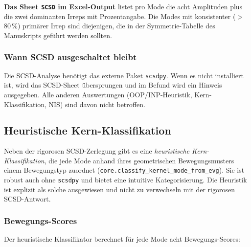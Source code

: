 \documentclass[11pt,a4paper,twoside]{article}
\theoremstyle{remark}
\begin{document}
\begin{infobox}
\textbf{Das Sheet \texttt{SCSD} im Excel-Output} listet pro Mode die
acht Amplituden plus die zwei dominanten Irreps mit Prozentangabe. Die
Modes mit konsistenter ($>$80\,\%) prim\"arer Irrep sind diejenigen,
die in der Symmetrie-Tabelle des Manuskripts gef\"uhrt werden sollten.
\end{infobox}

\subsubsection*{Wann SCSD ausgeschaltet bleibt}

Die SCSD-Analyse ben\"otigt das externe Paket \texttt{scsdpy}. Wenn
es nicht installiert ist, wird das SCSD-Sheet \"ubersprungen und im
Befund wird ein Hinweis ausgegeben. Alle anderen Auswertungen
(OOP/INP-Heuristik, Kern-Klassifikation, NIS) sind davon nicht
betroffen.

\subsection{Heuristische Kern-Klassifikation}
\label{sec:kern-klassifikation}

Neben der rigorosen SCSD-Zerlegung gibt es eine \emph{heuristische
Kern-Klassifikation}, die jede Mode anhand ihres geometrischen
Bewegungsmusters einem Bewegungstyp zuordnet
(\texttt{core.classify\_kernel\_mode\_from\_evg}). Sie ist robust auch
ohne \texttt{scsdpy} und bietet eine intuitive Kategorisierung. Die
Heuristik ist explizit als solche ausgewiesen und nicht zu verwechseln
mit der rigorosen SCSD-Antwort.

\subsubsection*{Bewegungs-Scores}

Der heuristische Klassifikator berechnet f\"ur jede Mode acht
Bewegungs-Scores:
\end{document}
